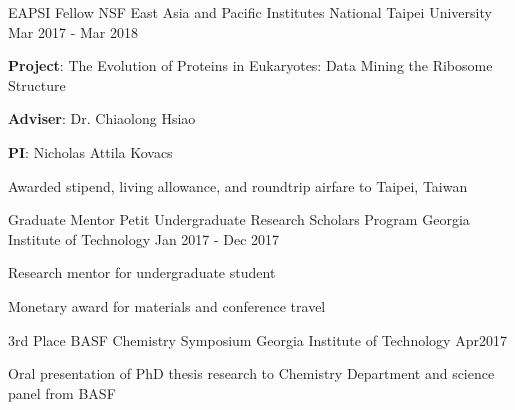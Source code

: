 

\begin{cventries}

  \cventry
    {EAPSI Fellow} %
    {NSF East Asia and Pacific Institutes} %
    {National Taipei University} %
    {Mar 2017 - Mar 2018} %
    {
      \begin{cvitems} %
        \item {{\bf Project}: The Evolution of Proteins in Eukaryotes: Data Mining the Ribosome Structure}
        \item {{\bf Adviser}: Dr. Chiaolong Hsiao}
        \item {{\bf PI}: Nicholas Attila Kovacs}
        \item {Awarded stipend, living allowance, and roundtrip airfare to Taipei, Taiwan}
      \end{cvitems}
    }

  \cventry
    {Graduate Mentor} %
    {Petit Undergraduate Research Scholars Program} %
    {Georgia Institute of Technology} %
    {Jan 2017 - Dec 2017} %
    {
      \begin{cvitems} %
        \item {Research mentor for undergraduate student}
        \item {Monetary award for materials and conference travel}
      \end{cvitems}
    }

  \cventry
    {3rd Place} %
    {BASF Chemistry Symposium} %
    {Georgia Institute of Technology} %
    {Apr2017} %
    {
      \begin{cvitems} %
      	\item {Oral presentation of PhD thesis research to Chemistry Department and science panel from BASF}
      \end{cvitems}
    }
\vspace{-4.5mm}


\end{cventries}
